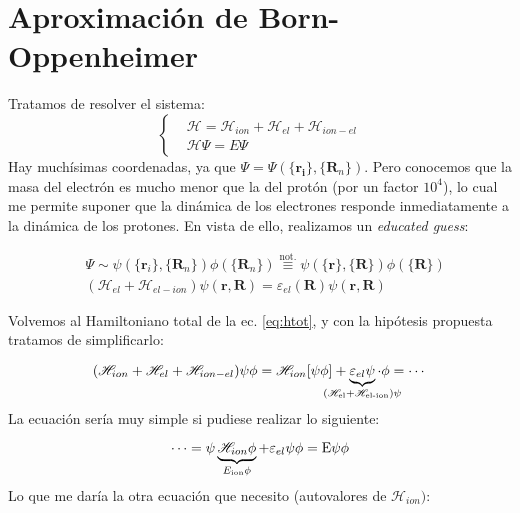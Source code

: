 \chapter{Aproximación de Born-Oppenheimer}
\label{sec:bornopp}
Tratamos de resolver el sistema:
\begin{equation}
\label{eq:htot} 
 \begin{cases}
    &\mathcal{H} = \mathcal{H}_{ion} + \mathcal{H}_{el} + \mathcal{H}_{ion-el} \\
    &\mathcal{H}\Psi = E \Psi
  \end{cases}
\end{equation}
Hay muchísimas coordenadas, ya que
$\Psi = \Psi(\{\mathbf{r_i}\},\{\mathbf{R}_n\})$. Pero conocemos que
la masa del electrón es mucho menor que la del protón (por un factor
$10^4$), lo cual me permite suponer que la dinámica de los electrones
responde inmediatamente a la dinámica de los protones. En vista de
ello, realizamos un \emph{educated guess}:

\begin{equation}
  \begin{split}
    &\Psi \sim \psi(\{ \mathbf{r}_i \}, \{ \mathbf{R}_n\})\phi( \{ \mathbf{R}_n\}) \stackrel{\text{not.}}{\equiv} \psi(\{ \mathbf{r} \}, \{ \mathbf{R}\})\phi( \{ \mathbf{R}\})\\
    & (\mathcal{H}_{el}+\mathcal{H}_{el-ion})\psi(\mathbf{r},\mathbf{R})=\varepsilon _{el}(\mathbf{R})\psi(\mathbf{r},\mathbf{R})  
  \end{split}
\end{equation}

Volvemos al Hamiltoniano total de la ec. \ref{eq:htot}, y con la
hipótesis propuesta tratamos de simplificarlo:

\begin{equation}
  (\mathcal{H}_{ion}+\mathcal{H}_{el}+\mathcal{H}_{ion-el})\psi\phi = \mathcal{H}_{ion}[\psi\phi]+ 
  \underbrace{\varepsilon _{el} \psi}_{\mathclap{(\mathcal{H_{\text{el}} + \mathcal{H}_{\text{el-ion}}})\psi}}\cdot \phi=\cdots
\end{equation}
La ecuación sería muy simple si pudiese realizar lo siguiente:

\begin{equation}
\label{eq:ansatz}
  \cdots=\psi \underbrace{\mathcal{H}_{ion} \phi}_{E_{\text{ion}}\phi} + \varepsilon _{el} \psi \phi = \text E \psi \phi
\end{equation}
Lo que me daría la otra ecuación que necesito (autovalores de $\mathcal{H}_{ion})$:

